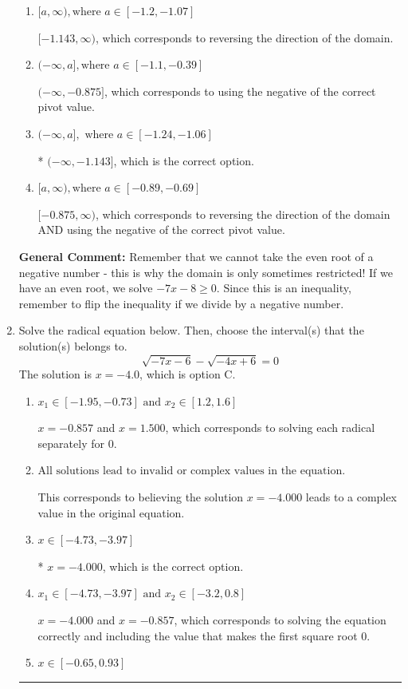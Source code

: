 \documentclass{extbook}[14pt]
\newcommand{\litem}[1]{\item #1

\rule{\textwidth}{0.4pt}}
\begin{document}
\begin{enumerate}
{\begin{enumerate}[label=\Alph*.]
This corresponds to the radical having an odd power, but the radical for this question is even.
\item \( [a, \infty), \text{where } a \in [-1.2, -1.07] \)

 $[-1.143, \infty)$, which corresponds to reversing the direction of the domain.
\item \( (-\infty, a], \text{where } a \in [-1.1, -0.39] \)

$(-\infty, -0.875]$, which corresponds to using the negative of the correct pivot value.
\item \( (-\infty, a], \text{ where } a \in [-1.24, -1.06] \)

* $(-\infty, -1.143]$, which is the correct option.
\item \( [a, \infty), \text{where } a \in [-0.89, -0.69] \)

$[-0.875, \infty)$, which corresponds to reversing the direction of the domain AND using the negative of the correct pivot value.
\end{enumerate}

\textbf{General Comment:} Remember that we cannot take the even root of a negative number - this is why the domain is only sometimes restricted! If we have an even root, we solve $-7 x - 8 \geq 0$. Since this is an inequality, remember to flip the inequality if we divide by a negative number.
}
\litem{
Solve the radical equation below. Then, choose the interval(s) that the solution(s) belongs to.
\[ \sqrt{-7 x - 6} - \sqrt{-4 x + 6} = 0 \]The solution is \( x = -4.0 \), which is option C.\begin{enumerate}[label=\Alph*.]
\item \( x_1 \in [-1.95, -0.73] \text{ and } x_2 \in [1.2,1.6] \)

$x = -0.857$ and $x = 1.500$, which corresponds to solving each radical separately for 0.
\item \( \text{All solutions lead to invalid or complex values in the equation.} \)

This corresponds to believing the solution $x = -4.000$ leads to a complex value in the original equation.
\item \( x \in [-4.73,-3.97] \)

* $x = -4.000$, which is the correct option.
\item \( x_1 \in [-4.73, -3.97] \text{ and } x_2 \in [-3.2,0.8] \)

$x = -4.000$ and $x = -0.857$, which corresponds to solving the equation correctly and including the value that makes the first square root 0.
\item \( x \in [-0.65,0.93] \)


\end{enumerate}}
\end{enumerate}
\end{document}

